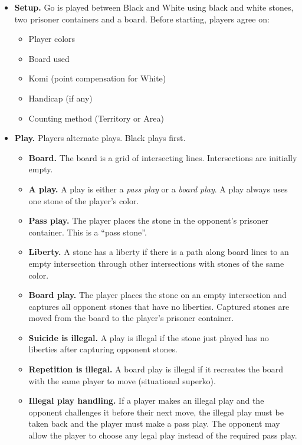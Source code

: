 \documentclass[11pt]{article}
\begin{document}
\begin{itemize}
\item \textbf{Setup.} Go is played between Black and White using black and white stones, two prisoner containers and a board.
Before starting, players agree on:
    \begin{itemize}
    \item Player colors
    \item Board used
    \item Komi (point compensation for White)
    \item Handicap (if any)
    \item Counting method (Territory or Area)
    \end{itemize}

\item \textbf{Play.} Players alternate plays.
Black plays first.
    \begin{itemize}
    \item \textbf{Board.} The board is a grid of intersecting lines.
    Intersections are initially empty.
    \item \textbf{A play.} A play is either a \textit{pass play} or a \textit{board play}.
    A play always uses one stone of the player's color.
    \item \textbf{Pass play.} The player places the stone in the opponent's prisoner container.
    This is a ``pass stone''.
    \item \textbf{Liberty.} A stone has a liberty if there is a path along board lines to an empty intersection through other intersections with stones of the same color.
    \item \textbf{Board play.} The player places the stone on an empty intersection and captures all opponent stones that have no liberties.
    Captured stones are moved from the board to the player's prisoner container.
    \item \textbf{Suicide is illegal.} A play is illegal if the stone just played has no liberties after capturing opponent stones.
    \item \textbf{Repetition is illegal.} A board play is illegal if it recreates the board with the same player to move (situational superko).
    \item \textbf{Illegal play handling.} If a player makes an illegal play and the opponent challenges it before their next move, the illegal play must be taken back and the player must make a pass play.
    The opponent may allow the player to choose any legal play instead of the required pass play.
    \end{itemize}


\end{itemize}
\end{document}
